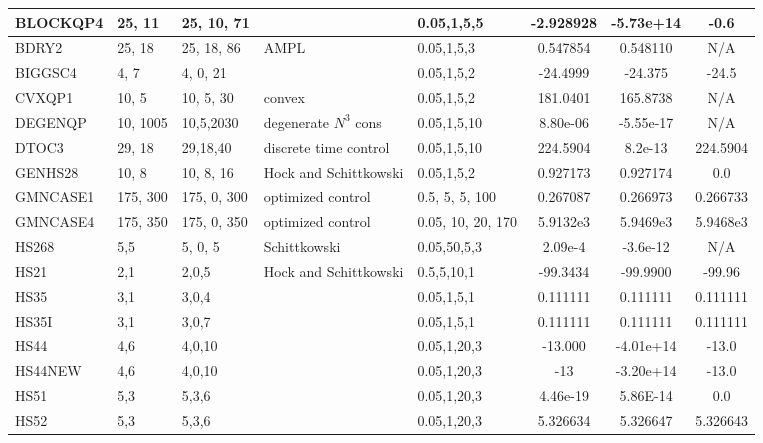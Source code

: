 \begin{landscape}
\begin{longtable}{l | l |  l  |  >{\footnotesize}p{3.5cm} | l | c | c | c  }
BLOCKQP4  & 25, 11    & 25, 10, 71  &    & 0.05,1,5,5     &\cellcolor{blue} -2.928928   & \cellcolor{blue}-5.73e+14   &    \cellcolor{blue} -0.6   \\ \hline
BDRY2   & 25, 18   & 25, 18, 86   &  AMPL  & 0.05,1,5,3  & 0.547854  & 0.548110  & N/A    \\ \hline   
BIGGSC4  & 4, 7   & 4, 0, 21   & & 0.05,1,5,2  & -24.4999   &  -24.375  &    -24.5 \\ \hline 
CVXQP1  & 10, 5 & 10, 5, 30  & convex   & 0.05,1,5,2 & \cellcolor{blue}181.0401 & \cellcolor{blue}165.8738  & N/A   \\ \hline
DEGENQP & 10, 1005 & 10,5,2030  & degenerate  $N^3$ cons & 0.05,1,5,10  & 8.80e-06 & -5.55e-17  & N/A \\ \hline
DTOC3   & 29, 18  & 29,18,40 & discrete time control & 0.05,1,5,10  &  224.5904 & \cellcolor{yellow}8.2e-13  &\cellcolor{yellow} 224.5904 \\ \hline 
GENHS28 & 10, 8  & 10, 8, 16  & Hock and Schittkowski &   0.05,1,5,2   & 0.927173  & 0.927174  & 0.0   \\ \hline
GMNCASE1 &  175, 300   & 175, 0, 300  &   optimized control   & 0.5, 5, 5, 100   &   0.267087  & 0.266973             &    0.266733   \\ \hline
GMNCASE4 & 175, 350 & 175, 0, 350  &  optimized control &  0.05, 10, 20, 170      & 5.9132e3 &  5.9469e3 &   5.9468e3 \\ \hline 
HS268   & 5,5  & 5, 0, 5  &  Schittkowski   &  0.05,50,5,3    & 2.09e-4   & -3.6e-12      &    N/A    \\ \hline 
HS21    &  2,1 & 2,0,5   & Hock and  Schittkowski  &  0.5,5,10,1   & -99.3434  & -99.9900  & -99.96    \\ \hline 
HS35   &  3,1  & 3,0,4  &             &  0.05,1,5,1    & 0.111111  & 0.111111   &   0.111111   \\ \hline 
HS35I   &  3,1  & 3,0,7  &             &   0.05,1,5,1      & 0.111111  & 0.111111   &   0.111111   \\ \hline 
HS44   & 4,6   & 4,0,10   &  	 & 0.05,1,20,3      &  -13.000 &\cellcolor{yellow} -4.01e+14 & \cellcolor{yellow}-13.0    \\ \hline
HS44NEW & 4,6  & 4,0,10  &     &   0.05,1,20,3    & -13     &\cellcolor{yellow} -3.20e+14   &\cellcolor{yellow} -13.0    \\ \hline
HS51    &  5,3   & 5,3,6    &  & 0.05,1,20,3      & 4.46e-19   & 5.86E-14     & 0.0    \\ \hline
HS52    &  5,3  & 5,3,6   & & 0.05,1,20,3      & 5.326634   & 5.326647   & 5.326643   \\ \hline

\end{longtable}
\end{landscape}
